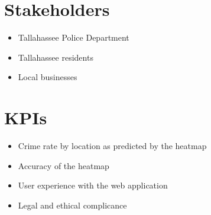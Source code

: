 \documentclass[10pt]{article}
\begin{document}
\section{Stakeholders}
\begin{itemize}
    \item Tallahassee Police Department
    \item Tallahassee residents
    \item Local businesses
\end{itemize}


\section{KPIs}
\begin{itemize}
    \item Crime rate by location as predicted by the heatmap
    \item Accuracy of the heatmap
    \item User experience with the web application
    \item Legal and ethical complicance
\end{itemize}
\end{document}
